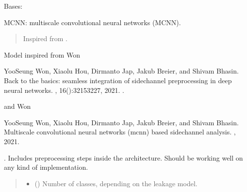 \documentclass[letterpaper,10pt,english]{sphinxmanual}
\begin{document}
\begin{fulllineitems}
\label{\detokenize{MLSCAlib.Architectures:MLSCAlib.Architectures.torch_models.MCNN}}
\pysigstartsignatures
{}
\pysigstopsignatures
\sphinxAtStartPar
Bases: 

\sphinxAtStartPar
MCNN: multi\sphinxhyphen{}scale convolutional neural networks (MCNN).
\begin{quote}

\sphinxAtStartPar
Inspired from .
\end{quote}

\sphinxAtStartPar
Model inspired from Won %
\begin{footnote}[4]\sphinxAtStartFootnote
Yoo\sphinxhyphen{}Seung Won, Xiaolu Hou, Dirmanto Jap, Jakub Breier, and Shivam Bhasin. Back to the basics: seamless integration of side\sphinxhyphen{}channel pre\sphinxhyphen{}processing in deep neural networks. , 16():3215\textendash{}3227, 2021. .
%
\end{footnote} and Won %
\begin{footnote}[5]\sphinxAtStartFootnote
Yoo\sphinxhyphen{}Seung Won, Xiaolu Hou, Dirmanto Jap, Jakub Breier, and Shivam Bhasin. Multi\sphinxhyphen{}scale convolutional neural networks (mcnn) based side\sphinxhyphen{}channel analysis. , 2021.
%
\end{footnote}.
Includes preprocessing steps inside the architecture. Should be working well on any kind of implementation.
\begin{quote}\begin{description}
\begin{itemize}
\item {} 
\sphinxAtStartPar
{} () \textendash{} Number of classes, depending on the leakage model.


\end{itemize}
\end{description}
\end{quote}
\end{fulllineitems}
\end{document}
